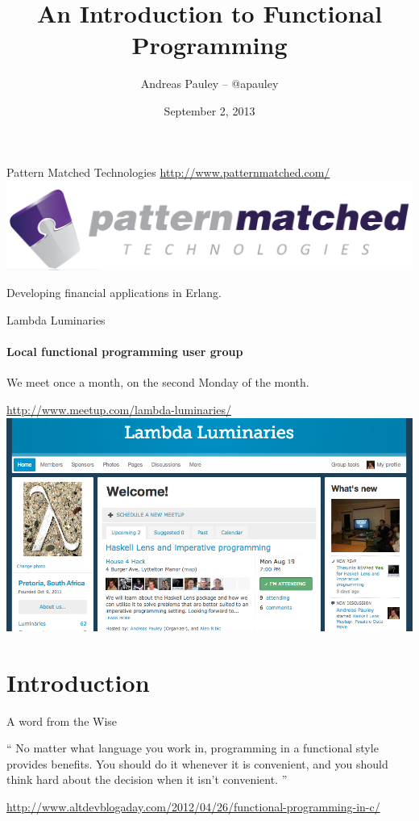 \documentclass{beamer}
\title[Functional Programming]{An Introduction to Functional Programming}
\author{Andreas Pauley -- @apauley}
\institute{Pattern Matched Technologies\\Lambda Luminaries}
\date{September 2, 2013}
\begin{document}
\begin{frame}
\titlepage
\end{frame}

\begin{frame}{Pattern Matched Technologies}
\url{http://www.patternmatched.com/}
\includegraphics[scale=0.21]{img/pmt-logo.png}

Developing financial applications in Erlang.
\end{frame}

\begin{frame}{Lambda Luminaries}
\framesubtitle{Local functional programming user group}
We meet once a month, on the second Monday of the month.

\url{http://www.meetup.com/lambda-luminaries/}
\includegraphics[scale=0.3]{img/LambdaLuminariesScreenShot2013-08-09.png}

\end{frame}

\section{Introduction}

\begin{frame}{A word from the Wise}

\begin{exampleblock}{}
  {\large ``
No matter what language you work in, programming
in a functional style provides benefits.
You should do it whenever it is convenient, and you
should think hard about the decision when it isn’t convenient.
  ''}
  \vskip5mm
  \hspace*{}
\end{exampleblock}


\url{http://www.altdevblogaday.com/2012/04/26/functional-programming-in-c/}

\end{frame}
\end{document}
